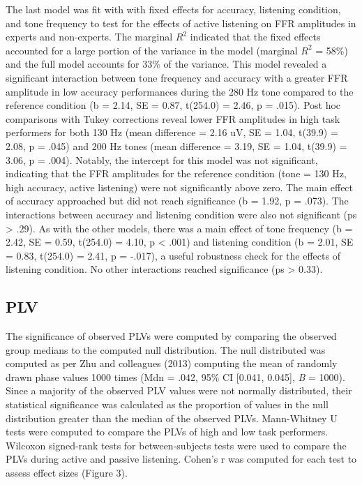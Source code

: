The last model was fit with with fixed effects for accuracy, listening condition, and tone frequency to test for the effects of active listening on FFR amplitudes in experts and non-experts. The marginal $R^2$ indicated that the fixed effects accounted for a large portion of the variance in the model (marginal $R^2$ = 58\%) and the full model accounts for 33\% of the variance. This model revealed a significant interaction between tone frequency and accuracy with a greater FFR amplitude in low accuracy performances during the 280 Hz tone compared to the reference condition (b = 2.14, SE = 0.87, t(254.0) = 2.46, p = .015). Post hoc comparisons with Tukey corrections reveal lower FFR amplitudes in high task performers for both 130 Hz (mean difference = 2.16 uV, SE = 1.04, t(39.9) = 2.08, p = .045) and 200 Hz tones (mean difference = 3.19, SE = 1.04, t(39.9) = 3.06, p = .004). Notably, the intercept for this model was not significant, indicating that the FFR amplitudes for the reference condition (tone = 130 Hz, high accuracy, active listening) were not significantly above zero. The main effect of accuracy approached but did not reach significance (b = 1.92, p = .073). The interactions between accuracy and listening condition were also not significant (ps > .29). As with the other models, there was a main effect of tone frequency (b = 2.42, SE = 0.59, t(254.0) = 4.10, p < .001) and listening condition (b = 2.01, SE = 0.83, t(254.0) = 2.41, p = -.017), a useful robustness check for the effects of listening condition. No other interactions reached significance (ps > 0.33).

\subsection*{PLV}

The significance of observed PLVs were computed by comparing the observed group medians to the computed null distribution. The null distributed was computed as per Zhu and colleagues (2013) computing the mean of randomly drawn phase values 1000 times (Mdn = .042, 95\% CI [0.041, 0.045], \textit{B} = 1000). Since a majority of the observed PLV values were not normally distributed, their statistical significance was calculated as the proportion of values in the null distribution greater than the median of the observed PLVs. Mann-Whitney U tests were computed to compare the PLVs of high and low task performers. Wilcoxon signed-rank tests for between-subjects tests were used to compare the PLVs during active and passive listening. Cohen's r was computed for each test to assess effect sizes (Figure 3).

